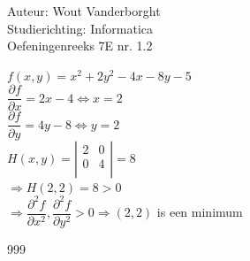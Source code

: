 \documentclass[a4paper]{article}
\begin{document}
  
\noindent \large Auteur: Wout Vanderborght\\
\noindent \large Studierichting: Informatica\\
\noindent \large Oefeningenreeks 7E nr. 1.2\\

\medskip

\normalsize

$ f(x, y) = x^2 + 2y^2 - 4x - 8y - 5 $ \\

$ \dfrac{\partial f}{\partial x} = 2x - 4 \Leftrightarrow x = 2 $ \\

$ \dfrac{\partial f}{\partial y} = 4y - 8 \Leftrightarrow y = 2 $ \\

$ H(x, y) = \left| \begin{array}{cc}
2 & 0 \\ 
0 & 4 \\ 
\end{array} \right| = 8 $ \\

$ \Rightarrow H(2, 2) = 8 > 0 $ \\

$ \Rightarrow \dfrac{\partial^2 f}{\partial x^2}, \dfrac{\partial^2 f}{\partial y^2} > 0 \Rightarrow (2, 2) $ is een minimum \\

\begin{thebibliography}{999}
\end{thebibliography}
\end{document}
